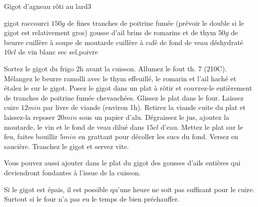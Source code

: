 \begin{recette}{Gigot d'agneau rôti au lard}{3}{}{}
\begin{ingredients}
\ingredient gigot raccourci
\ingredient $150\unit{g}$ de fines tranches de poitrine fumée (prévoir le double si le gigot est relativement gros)
 gousse d'ail
 brins de romarins et de thym
\ingredient $50\unit{g}$ de beurre
 cuillère à soupe de moutarde
 cuillère à café de fond de veau déshydraté
\ingredient $10\unit{cl}$ de vin blanc sec
\ingredient sel,poivre
\end{ingredients}

\begin{preparation}
\etape Sortez le gigot du frigo 2h avant la cuisson. Allumez le fout th. 7 (210\degres C). Mélangez le beurre ramolli avec le thym effeuillé, le romarin et l'ail haché et étalez le sur le gigot.
\etape Posez le gigot dans un plat à rôtir et couvrez-le entièrement de tranches de poitrine fumée chevauchées. Glissez le plat dans le four. Laissez cuire $12\unit{min}$ par livre de viande (environ 1h).
\etape Retirez la viande cuite du plat et laissez-la reposer $20\unit{min}$ sous un papier d'alu. Dégraissez le jus, ajoutez la moutarde, le vin et le fond de veau dilué dans $15\unit{cl}$ d'eau.
\etape Mettez le plat sur le feu, faites bouillir $5\unit{min}$ en grattant pour décoller les sucs du fond. Versez en saucière. Tranchez le gigot et servez vite.
\end{preparation}

\begin{remarque}
Vous pouvez aussi ajouter dans le plat du gigot des gousses d'ails entières qui deviendront fondantes à l'issue de la cuisson.

Si le gigot est épais, il est possible qu'une heure ne soit pas suffisant pour le cuire. Surtout si le four n'a pas eu le temps de bien préchauffer.
\end{remarque}
\end{recette}



